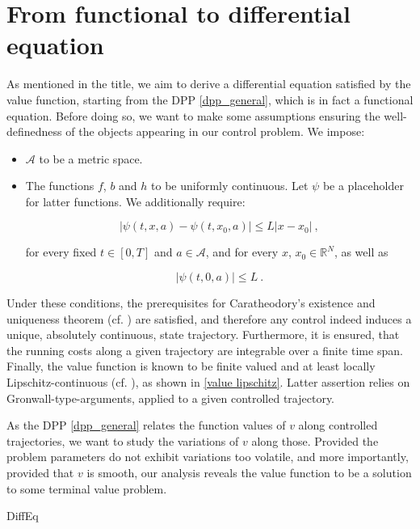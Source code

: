 
\section{From functional to differential equation}

As mentioned in the title, we aim to derive a differential equation satisfied by the value function, starting from the DPP \eqref{dpp_general}, which is in fact a functional equation. Before doing so, we want to make some assumptions ensuring the well-definedness of the objects appearing in our control problem. We impose:

	\begin{itemize}
		\item
		$ \mathcal{A} $ to be a metric space.
		
		\item The functions $ f $, $ b $ and $ h $ to be uniformly continuous. Let $ \psi $ be a placeholder for latter functions. We additionally require:
		
		\begin{equation}
			\label{Lipschitz}
			\lvert \psi(t, x, a) - \psi(t, x_0, a) \rvert \leq L \lvert x - x_0 \rvert \ ,
		\end{equation}
		
		for every fixed $ t \in \left[0, T \right] $ and $ a \in \mathcal{A} $, and for every $ x $, $ x_0 \in  \mathbb{R}^N $, as well as 
		
		\begin{equation}
			\label{bounded}
			\lvert \psi(t, 0, a) \rvert \leq L \ .
		\end{equation}
		
	\end{itemize}

Under these conditions, the prerequisites for  Caratheodory's existence and uniqueness theorem (cf. \cite[Theorem 1.45 p.~25]{roubivcek}) are satisfied, and therefore any control indeed induces a unique, absolutely continuous, state trajectory. Furthermore, it is ensured, that the running costs along a given trajectory are integrable over a finite time span. Finally, the value function is known to be finite valued and at least locally Lipschitz-continuous (cf. \cite[Inequality (2.36) from Theorem 2.5 p.~165]{zhou}), as shown in \ref{value lipschitz}. Latter assertion relies on Gronwall-type-arguments, applied to a given controlled trajectory.

As the DPP \eqref{dpp_general} relates the function values of $ v $ along controlled trajectories, we want to study the variations of $ v $ along those. Provided the problem parameters do not exhibit variations too volatile, and more importantly, provided that $ v $ is smooth, our analysis reveals the value  function to be a solution to some terminal value problem.

	{DiffEq}